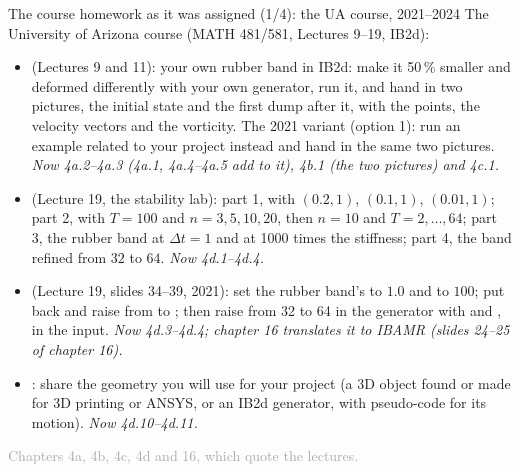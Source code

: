 \documentclass[aspectratio=169,11pt]{beamer}
\newcommand{\sourcecredit}[1]{\vfill\begin{flushright}\tiny\textcolor{DarkGray}{#1}\end{flushright}}
\begin{document}
\begin{frame}{The course homework as it was assigned (1/4): the UA course, 2021--2024}
\label{fr:hw1}
\footnotesize
The University of Arizona course (MATH 481/581, Lectures 9--19, IB2d):
\begin{itemize}\setlength{\itemsep}{3pt}
  \item {} (Lectures 9 and 11): your own rubber band in IB2d: make it 50\,\% smaller and deformed differently with your own generator, run it, and hand in two pictures, the initial state and the first dump after it, with the points, the velocity vectors and the vorticity. The 2021 variant (option 1): run an example related to your project instead and hand in the same two pictures. \emph{Now 4a.2--4a.3 (4a.1, 4a.4--4a.5 add to it), 4b.1 (the two pictures) and 4c.1.}
  \item {} (Lecture 19, the stability lab): part 1,  with $(0.2, 1)$, $(0.1, 1)$, $(0.01, 1)$; part 2,  with $T = 100$ and $n = 3, 5, 10, 20$, then $n = 10$ and $T = 2, \ldots, 64$; part 3, the rubber band at $\Delta t = 1$ and at 1000 times the stiffness; part 4, the band refined from $32$ to $64$. \emph{Now 4d.1--4d.4.}
  \item {} (Lecture 19, slides 34--39, 2021): set the rubber band's  to $1.0$ and  to $100$; put  back and raise  from  to ; then raise  from 32 to 64 in the generator with  and ,  in the input. \emph{Now 4d.3--4d.4; chapter 16 translates it to IBAMR (slides 24--25 of chapter 16).}
  \item {}: share the geometry you will use for your project (a 3D object found or made for 3D printing or ANSYS, or an IB2d generator, with pseudo-code for its motion). \emph{Now 4d.10--4d.11.}
\end{itemize}
\sourcecredit{Chapters 4a, 4b, 4c, 4d and 16, which quote the lectures.}
\end{frame}
\end{document}
